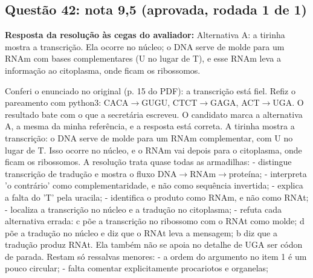 \documentclass{article}%
\begin{document}
\subsection*{Questão 42: nota 9,5 (aprovada, rodada 1 de 1)}%
\textbf{Resposta da resolução às cegas do avaliador:} Alternativa A: a tirinha mostra a transcrição. Ela ocorre no núcleo; o DNA serve de molde para um RNAm com bases complementares (U no lugar de T), e esse RNAm leva a informação ao citoplasma, onde ficam os ribossomos.\par %
Conferi o enunciado no original (p. 15 do PDF): a transcrição está fiel. Refiz o pareamento com python3: CACA$\to$GUGU, CTCT$\to$GAGA, ACT$\to$UGA. O resultado bate com o que a secretária escreveu.\newline%
\newline%
O candidato marca a alternativa A, a mesma da minha referência, e a resposta está correta. A tirinha mostra a transcrição: o DNA serve de molde para um RNAm complementar, com U no lugar de T. Isso ocorre no núcleo, e o RNAm vai depois para o citoplasma, onde ficam os ribossomos.\newline%
\newline%
A resolução trata quase todas as armadilhas:\newline%
{-} distingue transcrição de tradução e mostra o fluxo DNA$\to$RNAm$\to$proteína;\newline%
{-} interpreta 'o contrário' como complementaridade, e não como sequência invertida;\newline%
{-} explica a falta do 'T' pela uracila;\newline%
{-} identifica o produto como RNAm, e não como RNAt;\newline%
{-} localiza a transcrição no núcleo e a tradução no citoplasma;\newline%
{-} refuta cada alternativa errada: c põe a transcrição no ribossomo com o RNAt como molde; d põe a tradução no núcleo e diz que o RNAt leva a mensagem; b diz que a tradução produz RNAt.\newline%
\newline%
Ela também não se apoia no detalhe de UGA ser códon de parada.\newline%
\newline%
Restam só ressalvas menores:\newline%
{-} a ordem do argumento no item 1 é um pouco circular;\newline%
{-} falta comentar explicitamente procariotos e organelas;\newline%
\end{document}
